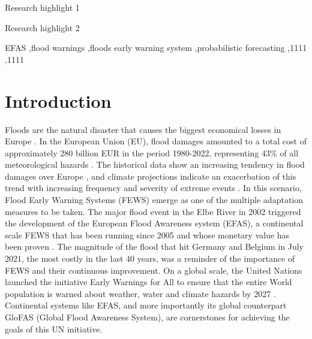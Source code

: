\documentclass[preprint,12pt,authoryear]{elsarticle}
\begin{document}
\begin{frontmatter}

\begin{highlights}
\item Research highlight 1
\item Research highlight 2
\end{highlights}

\begin{keyword}
EFAS \sep flood warnings \sep floods early warning system \sep probabilistic forecasting
 \sep 1111
 \sep 1111
\end{keyword}

\end{frontmatter}


\section{Introduction}
\label{sec:introduction}

Floods are the natural disaster that causes the biggest economical losses in Europe \cite{WMO2021}. In the European Union (EU), flood damages amounted to a total cost of approximately 280 billion EUR in the period 1980-2022, representing 43\% of all meteorological hazards \cite{EEA2023}. The historical data show an increasing tendency in flood damages over Europe \cite{EEA2023, Paprotny2018}, and climate projections indicate an exacerbation of this trend with increasing frequency and severity of extreme events \cite{Alfieri2017, IPCC2023}. In this scenario, Flood Early Warning Systems (FEWS) emerge as one of the multiple adaptation measures to be taken. The major flood event in the Elbe River in 2002 triggered the development of the European Flood Awareness system (EFAS), a continental scale FEWS that has been running since 2005 and whose monetary value has been proven \cite{Pappenberger2015b}. The magnitude of the flood that hit Germany and Belgium in July 2021, the most costly in the last 40 years, was a reminder of the importance of FEWS and their continuous improvement. On a global scale, the United Nations launched the initiative Early Warnings for All to ensure that the entire World population is warned about weather, water and climate hazards by 2027 \cite{UN2023}. Continental systems like EFAS, and more importantly its global counterpart GloFAS (Global Flood Awareness System), are cornerstones for achieving the goals of this UN initiative.
\end{document}
